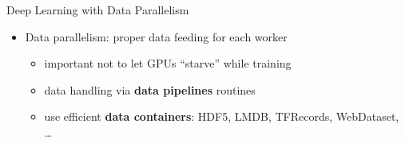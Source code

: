 \begin{frame}{Deep Learning with Data Parallelism}
\protect\hypertarget{deep-learning-with-data-parallelism-11}{}

\begin{itemize}
\tightlist
\item
  Data parallelism: proper data feeding for each worker

  \begin{itemize}
  \tightlist
  \item
    important not to let GPUs ``starve'' while training
  \item
    data handling via \textbf{data pipelines} routines
  \item
    use efficient \textbf{data containers}: HDF5, LMDB, TFRecords,
    WebDataset, \ldots{}
  \end{itemize}
\end{itemize}


\end{frame}

